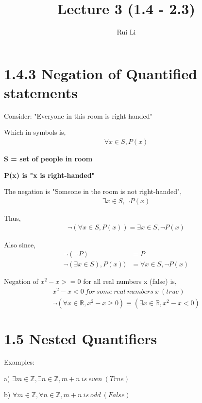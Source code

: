 \documentclass[11pt]{article}
\title{Lecture 3 (1.4 - 2.3)}
\author{Rui Li}
\begin{document}
\maketitle
\tableofcontents
\section*{1.4.3 Negation of Quantified statements}
Consider: "Everyone in this room is right handed"

Which in symbols is, 
\begin{align*}
    \forall x \in S, P(x)
\end{align*}

\bigskip

\textbf{S = set of people in room}

\textbf{P(x) is "x is right-handed"}

The negation is "Someone in the room is not right-handed",
\begin{align*}
    \exists x \in S, \neg P(x)
\end{align*}

Thus, 
\begin{align*}
    \neg(\forall x \in S, P(x)) = \exists x \in S, \neg P(x)
\end{align*}

Also since, 
\begin{align*}
    \neg(\neg P) &= P\\
    \neg(\exists x \in S), P(x)) &= \forall x \in S, \neg P(x)
\end{align*}
\medskip

Negation of $x^2 - x >= 0$ for all real numbers x (false) is, 
\begin{align*}
    x^2 -x < 0\ for\ some\ real\ numbers\ x\ (true)\\
    \neg(\forall x \in \mathbb{R}, x^2-x \geq 0)\equiv(\exists x \in \mathbb{R}, x^2 - x < 0)
\end{align*}

\section*{1.5 Nested Quantifiers}
Examples:

a) $\exists m \in \mathbb{Z}, \exists n \in \mathbb{Z}, m+n\ is\ even\ (True)$

b) $\forall m \in \mathbb{Z}, \forall n \in \mathbb{Z}, m+n\ is\ odd\ (False)$
\end{document}

